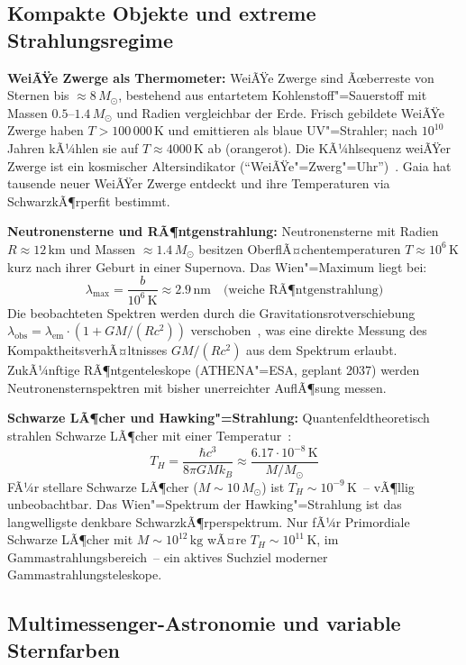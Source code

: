 ﻿\documentclass[a4paper,12pt]{article}
\theoremstyle{definition}
\begin{document}
\subsection{Kompakte Objekte und extreme Strahlungsregime}

\textbf{WeiÃŸe Zwerge als Thermometer:}
WeiÃŸe Zwerge sind Ãœberreste von Sternen bis $\approx 8\,M_\odot$,
bestehend aus entartetem Kohlenstoff"=Sauerstoff mit Massen
$0.5$--$1.4\,M_\odot$ und Radien vergleichbar der Erde.
Frisch gebildete WeiÃŸe Zwerge haben $T > 100\,000\,\text{K}$
und emittieren als blaue UV"=Strahler; nach $10^{10}$\,Jahren
kÃ¼hlen sie auf $T \approx 4000\,\text{K}$ ab (orangerot).
Die KÃ¼hlsequenz weiÃŸer Zwerge ist ein kosmischer Altersindikator
(``WeiÃŸe"=Zwerg"=Uhr'')~\cite{fontaine2001}. Gaia hat tausende neuer
WeiÃŸer Zwerge entdeckt und ihre Temperaturen via SchwarzkÃ¶rperfit
bestimmt.

\textbf{Neutronensterne und RÃ¶ntgenstrahlung:}
Neutronensterne mit Radien $R \approx 12\,\text{km}$ und Massen
$\approx 1.4\,M_\odot$ besitzen OberflÃ¤chentemperaturen
$T \approx 10^6\,\text{K}$ kurz nach ihrer Geburt in einer Supernova.
Das Wien"=Maximum liegt bei:
\[
    \lambda_{\max} = \frac{b}{10^6\,\text{K}} \approx 2.9\,\text{nm}
    \quad \text{(weiche RÃ¶ntgenstrahlung)}
\]
Die beobachteten Spektren werden durch die Gravitationsrotverschiebung
$\lambda_{\text{obs}} = \lambda_{\text{em}} \cdot (1 + GM/(Rc^2))$
verschoben~\cite{lattimer2012}, was eine direkte Messung des
KompaktheitsverhÃ¤ltnisses $GM/(Rc^2)$ aus dem Spektrum erlaubt.
ZukÃ¼nftige RÃ¶ntgenteleskope (ATHENA"=ESA, geplant 2037) werden
Neutronensternspektren mit bisher unerreichter AuflÃ¶sung messen.

\textbf{Schwarze LÃ¶cher und Hawking"=Strahlung:}
Quantenfeldtheoretisch strahlen Schwarze LÃ¶cher mit einer
Temperatur~\cite{hawking1975}:
\[
    T_H = \frac{\hbar c^3}{8\pi G M k_B}
    \approx \frac{6.17 \cdot 10^{-8}\,\text{K}}{M/M_\odot}
\]
FÃ¼r stellare Schwarze LÃ¶cher ($M \sim 10\,M_\odot$) ist $T_H \sim 10^{-9}\,\text{K}$~--
vÃ¶llig unbeobachtbar. Das Wien"=Spektrum der Hawking"=Strahlung ist das
langwelligste denkbare SchwarzkÃ¶rperspektrum. Nur fÃ¼r Primordiale
Schwarze LÃ¶cher mit $M \sim 10^{12}\,\text{kg}$ wÃ¤re $T_H \sim 10^{11}\,\text{K}$,
im Gammastrahlungsbereich~-- ein aktives Suchziel moderner Gammastrahlungsteleskope.

\subsection{Multimessenger-Astronomie und variable Sternfarben}
\end{document}
